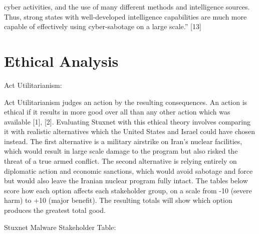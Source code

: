 cyber activities, and the use of many different methods and intelligence sources. Thus, strong states with well-developed intelligence capabilities are much more capable of effectively using cyber-sabotage on a large scale.” [13]

\section{Ethical Analysis}
Act Utilitarianism:

Act Utilitarianism judges an action by the resulting consequences. An action is ethical if it results in more good over all than any other action which was available [1], [2]. Evaluating Stuxnet with this ethical theory involves comparing it with realistic alternatives which the United States and Israel could have chosen instead. The first alternative is a military airstrike on Iran’s nuclear facilities, which would result in large scale damage to the program but also risked the threat of a true armed conflict. The second alternative is relying entirely on diplomatic action and economic sanctions, which would avoid sabotage and force but would also leave the Iranian nuclear program fully intact. The tables below score how each option affects each stakeholder group, on a scale from -10 (severe harm) to +10 (major benefit). The resulting totals will show which option produces the greatest total good.

Stuxnet Malware Stakeholder Table:

